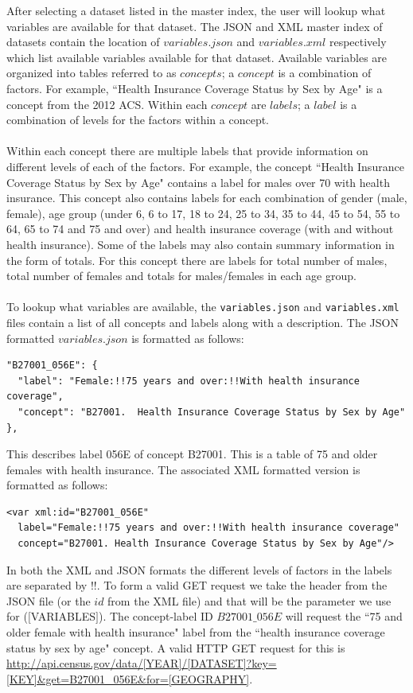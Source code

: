 \documentclass{article}\usepackage[]{graphicx}\usepackage[]{color}
\begin{document}
After selecting a dataset listed in the master index, the user will lookup what variables are available for that dataset.  The JSON and XML master index of datasets contain the location of $variables.json$ and $variables.xml$ respectively which list available variables available for that dataset.  Available variables are organized into tables referred to as $concepts$; a $concept$ is a combination of factors.  For example, ``Health Insurance Coverage Status by Sex by Age" is a concept from the 2012 ACS.  Within each $concept$ are $labels$; a $label$ is a combination of levels for the factors within a concept.\\
\\
Within each concept there are multiple labels that provide information on different levels of each of the factors.  For example, the concept ``Health Insurance Coverage Status by Sex by Age" contains a label for males over 70 with health insurance.  This concept also contains labels for each combination of gender (male, female), age group (under 6, 6 to 17, 18 to 24, 25 to 34, 35 to 44, 45 to 54, 55 to 64, 65 to 74 and 75 and over) and health insurance coverage (with and without health insurance).  Some of the labels may also contain summary information in the form of totals.  For this concept there are labels for total number of males, total number of females and totals for males/females in each age group.\\
\\
To lookup what variables are available, the {\tt variables.json} and {\tt variables.xml} files contain a list of all concepts and labels along with a description.  The JSON formatted $variables.json$ is formatted as follows:
\begin{verbatim}
"B27001_056E": {
  "label": "Female:!!75 years and over:!!With health insurance coverage",
  "concept": "B27001.  Health Insurance Coverage Status by Sex by Age"
},
\end{verbatim}
This describes label 056E of concept B27001.  This is a table of 75 and older females with health insurance.  The associated XML formatted version is formatted as follows:
\begin{verbatim}
<var xml:id="B27001_056E" 
  label="Female:!!75 years and over:!!With health insurance coverage" 
  concept="B27001. Health Insurance Coverage Status by Sex by Age"/>
\end{verbatim}
In both the XML and JSON formats the different levels of factors in the labels are separated by !!.  To form a valid GET request we take the header from the JSON file (or the $id$ from the XML file) and that will be the parameter we use for ($[$VARIABLES$]$).  The concept-label ID $B27001\_056E$ will request the ``75 and older female with health insurance" label from the ``health insurance coverage status by sex by age" concept.  A valid HTTP GET request for this is \url{http://api.census.gov/data/[YEAR]/[DATASET]?key=[KEY]&get=B27001_056E&for=[GEOGRAPHY]}.
\end{document}
